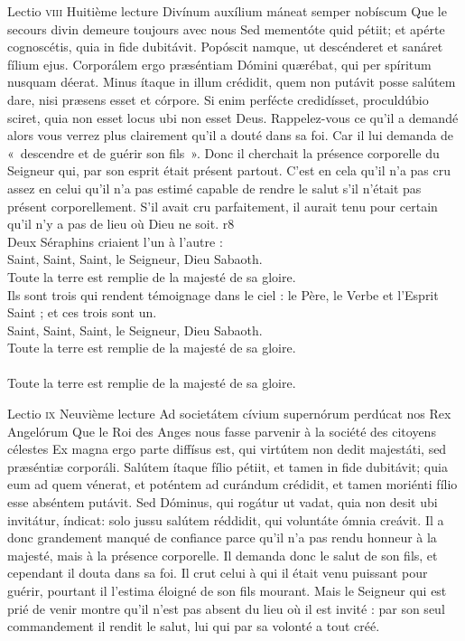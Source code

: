 \documentclass[twoside]{article}
\begin{document}
\begin{paracol}[1]{2}
\lectioresponsorium
	{Lectio \textsc{viii}}
	{Huitième lecture}
	{Divínum auxílium máneat semper nobíscum}
	{Que le secours divin demeure toujours avec nous}
	{
		Sed mementóte quid pétiit; et apérte cognoscétis, quia in fide dubitávit. Popóscit namque, ut descénderet et sanáret fílium ejus. Corporálem ergo præséntiam Dómini quærébat, qui per spíritum nusquam déerat. Minus ítaque in illum crédidit, quem non putávit posse salútem dare, nisi præsens esset et córpore. Si enim perfécte credidísset, proculdúbio sciret, quia non esset locus ubi non esset Deus.
	}
	{
		Rappelez-vous ce qu’il a demandé alors vous verrez plus clairement qu’il a douté dans sa foi. Car il lui demanda de «~descendre et de guérir son fils~». Donc il cherchait la présence corporelle du Seigneur qui, par son esprit était présent partout. C’est en cela qu’il n’a pas cru assez en celui qu’il n’a pas estimé capable de rendre le salut s’il n’était pas présent corporellement. S’il avait cru parfaitement, il aurait tenu pour certain qu’il n’y a pas de lieu où Dieu ne soit.
	}
	{r8}
	{~\\ \rr Deux Séraphins criaient l'un à l'autre :\\
	\GreSpecial{*} Saint, Saint, Saint, le Seigneur, Dieu Sabaoth.\\
	\GreSpecial{+} Toute la terre est remplie de la majesté de sa gloire.\\
	\vv Ils sont trois qui rendent témoignage dans le ciel : le Père, le Verbe et l’Esprit Saint ; et ces trois sont un.\\
	\GreSpecial{*} Saint, Saint, Saint, le Seigneur, Dieu Sabaoth.\\
	\GreSpecial{+} Toute la terre est remplie de la majesté de sa gloire.\\
	\versetGloireAuPere{}\\
	\GreSpecial{+} Toute la terre est remplie de la majesté de sa gloire.\newpage}

\newpage	
\lectioresponsorium
	{Lectio \textsc{ix}}
	{Neuvième lecture}
	{Ad societátem cívium supernórum perdúcat nos Rex Angelórum}
	{Que le Roi des Anges nous fasse parvenir à la société des citoyens célestes}
	{
		Ex magna ergo parte diffísus est, qui virtútem non dedit majestáti, sed præséntiæ corporáli. Salútem ítaque fílio pétiit, et tamen in fide dubitávit; quia eum ad quem vénerat, et poténtem ad curándum crédidit, et tamen moriénti fílio esse abséntem putávit. Sed Dóminus, qui rogátur ut vadat, quia non desit ubi invitátur, índicat: solo jussu salútem réddidit, qui voluntáte ómnia creávit.
	}
	{
		Il a donc grandement manqué de confiance parce qu’il n’a pas rendu honneur à la majesté, mais à la présence corporelle. Il demanda donc le salut de son fils, et cependant il douta dans sa foi. Il crut celui à qui il était venu puissant pour guérir, pourtant il l’estima éloigné de son fils mourant. Mais le Seigneur qui est prié de venir montre qu’il n’est pas absent du lieu où il est invité : par son seul commandement il rendit le salut, lui qui par sa volonté a tout créé.
	}
	{}
	{}



\end{paracol}
\end{document}
